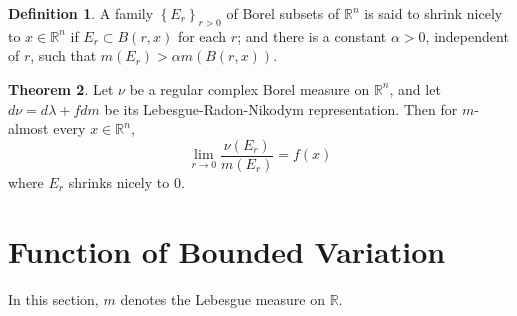 \documentclass[12pt,a4paper]{book}
\newcommand{\bb}[1]{\mathbb{#1}}
\theoremstyle{definition}
\newtheorem{defn}{Definition}[section]
\newtheorem{theo}[defn]{Theorem}
\begin{document}
\begin{defn}
    A family $\left\{E_r\right\}_{r>0}$ of Borel subsets of $\mathbb{R}^n$ is said to shrink nicely to $x \in \mathbb{R}^n$ if $E_r \subset B(r, x)$ for each $r$;
    and there is a constant $\alpha>0$, independent of $r$, such that $m\left(E_r\right)>\alpha m(B(r, x))$.
\end{defn}
\begin{theo}
    Let $\nu$ be a regular complex Borel measure on $\mathbb{R}^n$, and let $d \nu=d \lambda+f d m$ be its Lebesgue-Radon-Nikodym representation. 
    Then for $m$-almost every $x \in \mathbb{R}^n$,
    $$
        \lim _{r \rightarrow 0} \frac{\nu\left(E_r\right)}{m\left(E_r\right)}=f(x)
    $$
    where $E_r$ shrinks nicely to $0$.
    \label{Fundamental Theorem of Calculus, generalized version}
\end{theo}
\section{Function of Bounded Variation}
In this section, $m$ denotes the Lebesgue measure on $\bb{R}$. 
\end{document}
